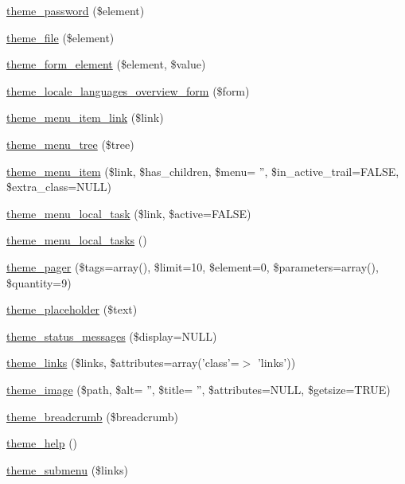 \begin{CompactItemize}
\hyperlink{group__themeable_g50dff4269f6095aedc025e9a48304515}{theme\_\-password} (\$element)
\item 
\hyperlink{group__themeable_g4c407a3bdc1e335e3b863f7ee747ef4d}{theme\_\-file} (\$element)
\item 
\hyperlink{group__themeable_g931b51a2d2c7b43f55a31292850e1078}{theme\_\-form\_\-element} (\$element, \$value)
\item 
\hyperlink{group__themeable_gc8da78f85ea472d2e50a0f32047c245f}{theme\_\-locale\_\-languages\_\-overview\_\-form} (\$form)
\item 
\hyperlink{group__themeable_g77f59240b3aead5df8a777e4f69961b5}{theme\_\-menu\_\-item\_\-link} (\$link)
\item 
\hyperlink{group__themeable_g88e49eaff39c8953c4ac72f4d2752ab1}{theme\_\-menu\_\-tree} (\$tree)
\item 
\hyperlink{group__themeable_gcb681206cbcb99f33b633da5c9d843c2}{theme\_\-menu\_\-item} (\$link, \$has\_\-children, \$menu= '', \$in\_\-active\_\-trail=FALSE, \$extra\_\-class=NULL)
\item 
\hyperlink{group__themeable_gea1a8b949266dc4264f73d64bb0a8ecd}{theme\_\-menu\_\-local\_\-task} (\$link, \$active=FALSE)
\item 
\hyperlink{group__themeable_g11a9f127932a0b272cc0c0dabb4e7d0b}{theme\_\-menu\_\-local\_\-tasks} ()
\item 
\hyperlink{group__themeable_g6901a5d4e96c9b81a92b3fa2e43cfebd}{theme\_\-pager} (\$tags=array(), \$limit=10, \$element=0, \$parameters=array(), \$quantity=9)
\item 
\hyperlink{group__themeable_gc300e87edb69de9245c38a1d09c66adc}{theme\_\-placeholder} (\$text)
\item 
\hyperlink{group__themeable_g45e373d20b2cbc62ecd05ae849a2b3bd}{theme\_\-status\_\-messages} (\$display=NULL)
\item 
\hyperlink{group__themeable_g6a23e012993ee8a2494249148d15d2bf}{theme\_\-links} (\$links, \$attributes=array('class'=$>$ 'links'))
\item 
\hyperlink{group__themeable_g035987a258a89e8f1ea7e9ee0f64369b}{theme\_\-image} (\$path, \$alt= '', \$title= '', \$attributes=NULL, \$getsize=TRUE)
\item 
\hyperlink{group__themeable_g499898a137ccb56620058a9ad884363a}{theme\_\-breadcrumb} (\$breadcrumb)
\item 
\hyperlink{group__themeable_ge7158ac517c2c15972c742ef074d366d}{theme\_\-help} ()
\item 
\hyperlink{group__themeable_g9967b5f542549c520851500eb25c4ffe}{theme\_\-submenu} (\$links)

\end{CompactItemize}
